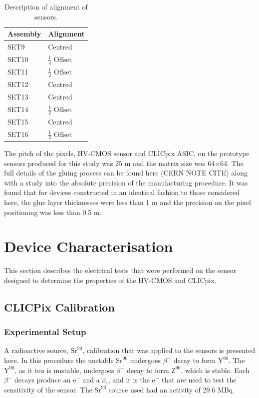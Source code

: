\begin{table}[h!]
\centering
\begin{tabular}{ l l }
\hline
Assembly & Alignment \\ 
\hline
SET9 & Centred \\
SET10 & $\frac{1}{4}$ Offset \\
SET11 & $\frac{1}{2}$ Offset \\
SET12 & Centred \\
SET13 & Centred \\
SET14 & $\frac{1}{2}$ Offset \\
SET15 & Centred \\
SET16 & $\frac{1}{2}$ Offset \\
\hline
\end{tabular}
\caption[Description of alignment of sensors.]{Description of alignment of sensors.}
\label{table:alignment}
\end{table}

The pitch of the pixels, HV-CMOS sensor and CLICpix ASIC, on the prototype sensors produced for this study was 25 {\mu}m and the matrix size was 64$\times$64.  The full details of the gluing process can be found here (CERN NOTE CITE) along with a study into the absolute precision of the manufacturing procedure.  It was found that for devices constructed in an identical fashion to those considered here, the glue layer thicknesses were less than 1 {\mu}m and the precision on the pixel positioning was less than 0.5 {\mu}m.  


\section{Device Characterisation}

This section describes the electrical tests that were performed on the sensor designed to determine the properties of the HV-CMOS and CLICpix.  


\subsection{CLICPix Calibration}

\subsubsection{Experimental Setup}
A radioactive source, $\text{Sr}^{90}$, calibration that was applied to the sensors is presented here.  In this procedure the unstable $\text{Sr}^{90}$ undergoes $\beta^{-}$ decay to form $\text{Y}^{90}$.  The $\text{Y}^{90}$, as it too is unstable, undergoes $\beta^{-}$ decay to form $\text{Z}^{90}$, which is stable.  Each $\beta^{-}$ decays produce an $\text{e}^{-}$ and a $\bar{\nu_{e}}$, and it is the $\text{e}^{-}$ that are used to test the sensitivity of the sensor.  The $\text{Sr}^{90}$ source used had an activity of 29.6 MBq.  


